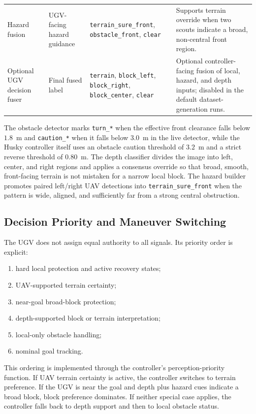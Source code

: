 \begin{table}[tbp]
\begin{tabularx}{\textwidth}{@{}>{\raggedright\arraybackslash}p{}>{\raggedright\arraybackslash}p{}>{\raggedright\arraybackslash}p{}X@{}}
        Hazard fusion & UGV-facing hazard guidance & \texttt{terrain\_sure\_front}, \texttt{obstacle\_front}, \texttt{clear} & Supports terrain override when two scouts indicate a broad, non-central front region. \\
        Optional UGV decision fuser & Final fused label & \texttt{terrain}, \texttt{block\_left}, \texttt{block\_right}, \texttt{block\_center}, \texttt{clear} & Optional controller-facing fusion of local, hazard, and depth inputs; disabled in the default dataset-generation runs. \\
        \bottomrule
    \end{tabularx}
\end{table}

The obstacle detector marks \texttt{turn\_*} when the effective front clearance falls below $1.8$~m and \texttt{caution\_*} when it falls below $3.0$~m in the live detector, while the Husky controller itself uses an obstacle caution threshold of $3.2$~m and a strict reverse threshold of $0.80$~m. The depth classifier divides the image into left, center, and right regions and applies a consensus override so that broad, smooth, front-facing terrain is not mistaken for a narrow local block. The hazard builder promotes paired left/right UAV detections into \texttt{terrain\_sure\_front} when the pattern is wide, aligned, and sufficiently far from a strong central obstruction.

\subsection{Decision Priority and Maneuver Switching}

The UGV does not assign equal authority to all signals. Its priority order is explicit:

\begin{enumerate}
\item hard local protection and active recovery states;
\item UAV-supported terrain certainty;
\item near-goal broad-block protection;
\item depth-supported block or terrain interpretation;
\item local-only obstacle handling;
\item nominal goal tracking.
\end{enumerate}

This ordering is implemented through the controller's perception-priority function. If UAV terrain certainty is active, the controller switches to terrain preference. If the UGV is near the goal and depth plus hazard cues indicate a broad block, block preference dominates. If neither special case applies, the controller falls back to depth support and then to local obstacle status.

